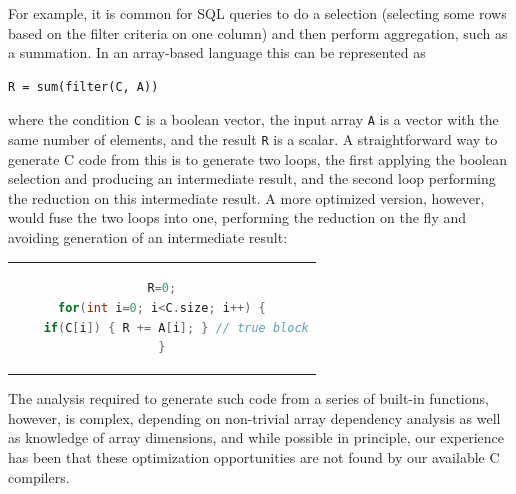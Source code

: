 For example, it is common for SQL queries to do a selection (selecting some
rows based on the filter criteria on one column) and then perform aggregation,
such as a summation.  In an array-based language this can be represented as

\begin{small}
\begin{Verbatim}[xleftmargin=.3\columnwidth]
R = sum(filter(C, A))
\end{Verbatim}
\end{small}


\noindent{}where the condition \texttt{C} is a boolean vector, the input array \texttt{A}
is a vector with the same number of elements, and the result \texttt{R} is a
scalar.  A straightforward way to generate C code from this is to generate two loops, the first applying the boolean selection and producing an intermediate result, and the second loop performing the reduction on this intermediate result.  A more optimized version, however, would fuse the two loops into one, performing the reduction on the fly and avoiding generation of an intermediate result:

\begin{center}
\begin{tabular}{c}
\begin{lstlisting}[language=C, frame=single, basicstyle=\small, linewidth=.92\columnwidth]
R=0;
for(int i=0; i<C.size; i++) {
    if(C[i]) { R += A[i]; } // true block
}
\end{lstlisting}
\end{tabular}
\end{center}



\noindent{}The analysis required to generate such code from a series of built-in functions, however, is complex,
depending on non-trivial array dependency analysis as well as knowledge of array dimensions, and 
while possible in principle, our experience has been that these optimization opportunities are not found by our available C compilers.

